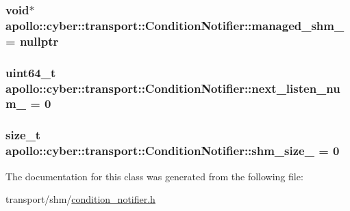 \hypertarget{classapollo_1_1cyber_1_1transport_1_1ConditionNotifier_a22cba07e5cce1d0a782c51f3bcbb09c8}{
\subsubsection[{managed\-\_\-shm\-\_\-}]{\setlength{\rightskip}{0pt plus 5cm}void$\ast$ apollo\-::cyber\-::transport\-::\-Condition\-Notifier\-::managed\-\_\-shm\-\_\- = nullptr\hspace{0.3cm}{\ttfamily [private]}}}\label{classapollo_1_1cyber_1_1transport_1_1ConditionNotifier_a22cba07e5cce1d0a782c51f3bcbb09c8}
\hypertarget{classapollo_1_1cyber_1_1transport_1_1ConditionNotifier_a55460f4f3c02cd6cb0d5e0dcabd7576e}{
\subsubsection[{next\-\_\-listen\-\_\-num\-\_\-}]{\setlength{\rightskip}{0pt plus 5cm}uint64\-\_\-t apollo\-::cyber\-::transport\-::\-Condition\-Notifier\-::next\-\_\-listen\-\_\-num\-\_\- = 0\hspace{0.3cm}{\ttfamily [private]}}}\label{classapollo_1_1cyber_1_1transport_1_1ConditionNotifier_a55460f4f3c02cd6cb0d5e0dcabd7576e}
\hypertarget{classapollo_1_1cyber_1_1transport_1_1ConditionNotifier_a48fcd814d133e570bcaaed0527e72edc}{
\subsubsection[{shm\-\_\-size\-\_\-}]{\setlength{\rightskip}{0pt plus 5cm}size\-\_\-t apollo\-::cyber\-::transport\-::\-Condition\-Notifier\-::shm\-\_\-size\-\_\- = 0\hspace{0.3cm}{\ttfamily [private]}}}\label{classapollo_1_1cyber_1_1transport_1_1ConditionNotifier_a48fcd814d133e570bcaaed0527e72edc}


The documentation for this class was generated from the following file\-:\begin{DoxyCompactItemize}
\item 
transport/shm/\hyperlink{condition__notifier_8h}{condition\-\_\-notifier.\-h}\end{DoxyCompactItemize}
